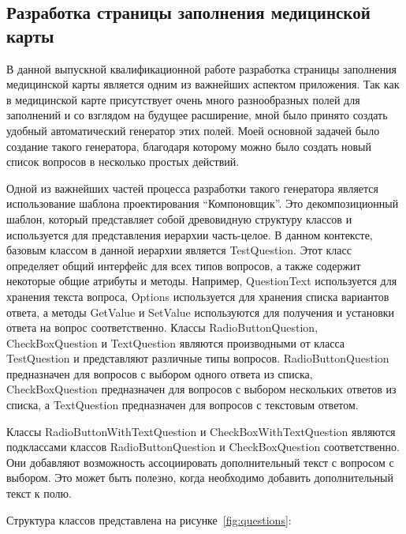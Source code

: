 \subsection{Разработка страницы заполнения медицинской карты}
В данной выпускной квалификационной работе разработка страницы заполнения медицинской карты является одним из важнейших аспектом приложения. Так как в медицинской карте присутствует очень много разнообразных полей для заполнений и со взглядом на будущее расширение, мной было принято создать удобный автоматический генератор этих полей. Моей основной задачей было создание такого генератора, благодаря которому можно было создать новый список вопросов в несколько простых действий.

Одной из важнейших частей процесса разработки такого генератора является использование шаблона проектирования \enquote{Компоновщик}. Это декомпозиционный шаблон, который представляет собой древовидную структуру классов и используется для представления иерархии часть-целое. В данном контексте, базовым классом в данной иерархии является TestQuestion. Этот класс определяет общий интерфейс для всех типов вопросов, а также содержит некоторые общие атрибуты и методы. Например, QuestionText используется для хранения текста вопроса, Options используется для хранения списка вариантов ответа, а методы GetValue и SetValue используются для получения и установки ответа на вопрос соответственно. Классы RadioButtonQuestion, CheckBoxQuestion и TextQuestion являются производными от класса TestQuestion и представляют различные типы вопросов. RadioButtonQuestion предназначен для вопросов с выбором одного ответа из списка, CheckBoxQuestion предназначен для вопросов с выбором нескольких ответов из списка, а TextQuestion предназначен для вопросов с текстовым ответом.

Классы RadioButtonWithTextQuestion и CheckBoxWithTextQuestion являются подклассами классов RadioButtonQuestion и CheckBoxQuestion соответственно. Они добавляют возможность ассоциировать дополнительный текст с вопросом с выбором. Это может быть полезно, когда необходимо добавить дополнительный текст к полю.

Структура классов представлена на рисунке~\ref{fig:questions}:


